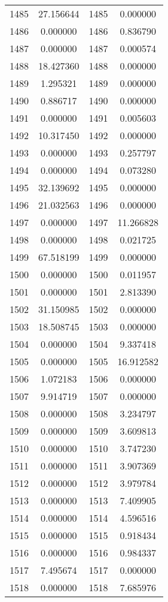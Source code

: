 \documentclass[12pt]{article}
\begin{document}
\begin{longtable}{@{}cccc@{}}
1485 & 27.156644 & 1485 & 0.000000 \\
1486 & 0.000000 & 1486 & 0.836790 \\
1487 & 0.000000 & 1487 & 0.000574 \\
1488 & 18.427360 & 1488 & 0.000000 \\
1489 & 1.295321 & 1489 & 0.000000 \\
1490 & 0.886717 & 1490 & 0.000000 \\
1491 & 0.000000 & 1491 & 0.005603 \\
1492 & 10.317450 & 1492 & 0.000000 \\
1493 & 0.000000 & 1493 & 0.257797 \\
1494 & 0.000000 & 1494 & 0.073280 \\
1495 & 32.139692 & 1495 & 0.000000 \\
1496 & 21.032563 & 1496 & 0.000000 \\
1497 & 0.000000 & 1497 & 11.266828 \\
1498 & 0.000000 & 1498 & 0.021725 \\
1499 & 67.518199 & 1499 & 0.000000 \\
1500 & 0.000000 & 1500 & 0.011957 \\
1501 & 0.000000 & 1501 & 2.813390 \\
1502 & 31.150985 & 1502 & 0.000000 \\
1503 & 18.508745 & 1503 & 0.000000 \\
1504 & 0.000000 & 1504 & 9.337418 \\
1505 & 0.000000 & 1505 & 16.912582 \\
1506 & 1.072183 & 1506 & 0.000000 \\
1507 & 9.914719 & 1507 & 0.000000 \\
1508 & 0.000000 & 1508 & 3.234797 \\
1509 & 0.000000 & 1509 & 3.609813 \\
1510 & 0.000000 & 1510 & 3.747230 \\
1511 & 0.000000 & 1511 & 3.907369 \\
1512 & 0.000000 & 1512 & 3.979784 \\
1513 & 0.000000 & 1513 & 7.409905 \\
1514 & 0.000000 & 1514 & 4.596516 \\
1515 & 0.000000 & 1515 & 0.918434 \\
1516 & 0.000000 & 1516 & 0.984337 \\
1517 & 7.495674 & 1517 & 0.000000 \\
1518 & 0.000000 & 1518 & 7.685976 \\

\end{longtable}
\end{document}
